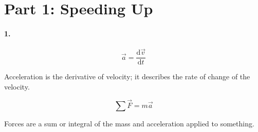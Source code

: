 

\usepackage{enumitem}
\usepackage{graphicx}
\graphicspath{ {./lab02images/} }


\renewcommand\assignment{Lab 2: Acceleration and Force, 2/7/2023, Partners: Maite Valentin-Lugo, Seth Waln}

    \section*{Part 1: Speeding Up}

    \paragraph*{1.}

    \begin{mdframed}
        \begin{equation}
            \vec{a} = \frac{\mathrm{d}\vec{v}}{\mathrm{d}t}
        \end{equation}

        Acceleration is the derivative of velocity; it describes the rate of change of the velocity.

        \begin{equation}
            \sum\vec{F} = m\vec{a}
        \end{equation}

        Forces are a sum or integral of the mass and acceleration applied to something.
    \end{mdframed}

